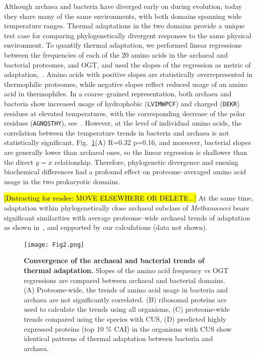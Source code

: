 \documentclass[10pt,letterpaper]{article}
\begin{document}
Although archaea and bacteria have diverged early on during evolution, today they share many of the same environments, with both domains spanning wide temperature ranges. Thermal adaptations in the two domains provide a unique test case for comparing phylogenetically divergent responses to the same physical environment. To quantify thermal adaptation, we performed linear regressions between the frequencies of each of the 20 amino acids in the archaeal and bacterial proteomes, and OGT, and used the slopes of the regression as metric of adaptation,~. Amino acids with positive slopes are statistically overrepresented in thermophilic proteomes, while negative slopes reflect reduced usage of an amino acid in thermophiles. In a coarse--grained representation, both archaea and bacteria show increased usage of hydrophobic (\texttt{LVIMWPCF}) and charged (\texttt{DEKR}) residues at elevated temperatures, with the corresponding decrease of the polar residues (\texttt{AGNQSTHY}), see~. However, at the level of individual amino acids, the correlation between the temperature trends in bacteria and archaea is not statistically significant, Fig.~\ref{fig:fig2}(A) R=0.32 p=0.16, and moreover, bacterial slopes are generally lower than archaeal ones, so the linear regression is shallower than the direct $y=x$ relationship. Therefore, phylogenetic divergence and ensuing biochemical differences had a profound effect on proteome--averaged amino acid usage in the two prokaryotic domains. 

\hl{[Distracting for reader: MOVE ELSEWHERE OR DELETE...]} At the same time, adaptation within phylogenetically close archaeal subclass of {\it Methanococci} bears significant similarities with average proteome--wide archaeal trends of adaptation as shown in~\cite{Haney1999Thermal}, and supported by our calculations (data not shown).

\begin{figure}[h!]
\texttt{[image: Fig2.png]}
\caption{
{\bf Convergence of the archaeal and bacterial trends of thermal adaptation.} Slopes of the amino acid frequency vs OGT regressions are compared between archaeal and bacterial domains.
(A) Proteome-wide, the trends of amino acid usage in bacteria and archaea are not significantly correlated.
(B) ribosomal proteins are used to calculate the trends using all organisms,
(C) proteome-wide trends compared using the species with CUS,
(D) predicted highly expressed proteins (top 10 \% CAI) in the organisms with CUS show identical patterns of thermal adaptation between bacteria and archaea.
}
\label{fig:fig2}
\end{figure}
\end{document}
